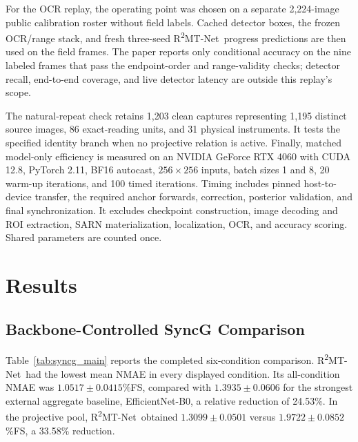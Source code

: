 \documentclass[electronics,article,submit,oneauthor]{Definitions/mdpi}
\newcommand{\modelname}{R\textsuperscript{2}MT-Net}
\begin{document}
For the OCR replay, the operating point was chosen on a separate 2,224-image public calibration roster without field labels. Cached detector boxes, the frozen OCR/range stack, and fresh three-seed \modelname\ progress predictions are then used on the field frames. The paper reports only conditional accuracy on the nine labeled frames that pass the endpoint-order and range-validity checks; detector recall, end-to-end coverage, and live detector latency are outside this replay's scope.

The natural-repeat check retains 1,203 clean captures representing 1,195 distinct source images, 86 exact-reading units, and 31 physical instruments. It tests the specified identity branch when no projective relation is active. Finally, matched model-only efficiency is measured on an NVIDIA GeForce RTX 4060 with CUDA 12.8, PyTorch 2.11, BF16 autocast, $256\times256$ inputs, batch sizes 1 and 8, 20 warm-up iterations, and 100 timed iterations. Timing includes pinned host-to-device transfer, the required anchor forwards, correction, posterior validation, and final synchronization. It excludes checkpoint construction, image decoding and ROI extraction, SARN materialization, localization, OCR, and accuracy scoring. Shared parameters are counted once.

\section{Results}
\label{sec:results}

\subsection{Backbone-Controlled SyncG Comparison}
\label{subsec:main_results}

Table~\ref{tab:syncg_main} reports the completed six-condition comparison. \modelname\ had the lowest mean NMAE in every displayed condition. Its all-condition NMAE was $1.0517\pm0.0415$\%FS, compared with $1.3935\pm0.0606$ for the strongest external aggregate baseline, EfficientNet-B0, a relative reduction of 24.53\%. In the projective pool, \modelname\ obtained $1.3099\pm0.0501$ versus $1.9722\pm0.0852$\%FS, a 33.58\% reduction.
\end{document}
